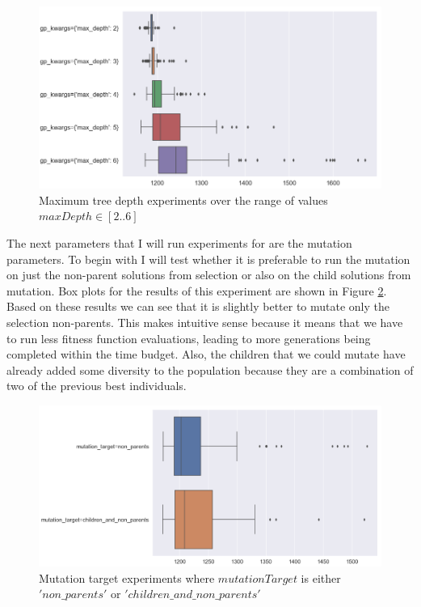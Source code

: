 \documentclass[11pt]{article}
\begin{document}
\begin{figure}[ht]
  \includegraphics[scale=0.45]{max_depth}
  \centering
  \caption{Maximum tree depth experiments over the range of values $maxDepth \in [2..6]$}
  \label{fig:max_depth}
\end{figure}

The next parameters that I will run experiments for are the mutation parameters.
To begin with I will test whether it is preferable to run the mutation on just the non-parent solutions from selection or also on the child solutions from mutation.
Box plots for the results of this experiment are shown in Figure \ref{fig:mutation_target}.
Based on these results we can see that it is slightly better to mutate only the selection non-parents.
This makes intuitive sense because it means that we have to run less fitness function evaluations, leading to more generations being completed within the time budget.
Also, the children that we could mutate have already added some diversity to the population because they are a combination of two of the previous best individuals.

\begin{figure}[ht]
  \includegraphics[scale=0.4]{mutation_target}
  \centering
  \caption{Mutation target experiments where $mutationTarget$ is either $'non\_parents'$ or $'children\_and\_non\_parents'$}
  \label{fig:mutation_target}
\end{figure}
\end{document}
